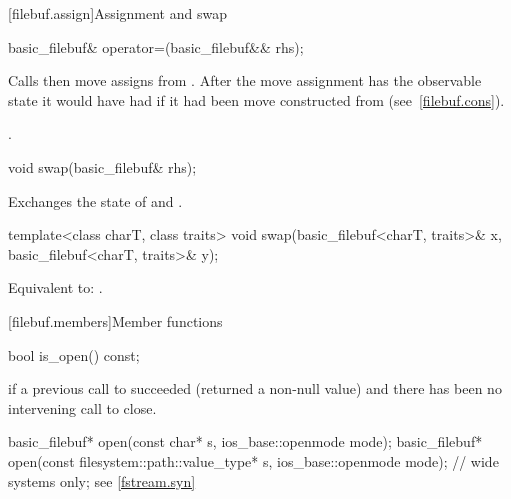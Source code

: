[filebuf.assign]{Assignment and swap}

%
\begin{itemdecl}
basic_filebuf& operator=(basic_filebuf&& rhs);
\end{itemdecl}

\begin{itemdescr}
\pnum
\effects
Calls  then move assigns from . After the
move assignment  has the observable state it would have had if it
had been move constructed from  (see~\ref{filebuf.cons}).

\pnum
\returns
{}.
\end{itemdescr}

%
\begin{itemdecl}
void swap(basic_filebuf& rhs);
\end{itemdecl}

\begin{itemdescr}
\pnum
\effects
Exchanges the state of 
and .
\end{itemdescr}

%
\begin{itemdecl}
template<class charT, class traits>
  void swap(basic_filebuf<charT, traits>& x, basic_filebuf<charT, traits>& y);
\end{itemdecl}

\begin{itemdescr}
\pnum
\effects
Equivalent to: .
\end{itemdescr}

[filebuf.members]{Member functions}

%
\begin{itemdecl}
bool is_open() const;
\end{itemdecl}

\begin{itemdescr}
\pnum
\returns
{}
if a previous call to
succeeded (returned a non-null value) and there has been no intervening
call to close.
\end{itemdescr}

%
\begin{itemdecl}
basic_filebuf* open(const char* s, ios_base::openmode mode);
basic_filebuf* open(const filesystem::path::value_type* s,
                    ios_base::openmode mode);  // wide systems only; see \ref{fstream.syn}
\end{itemdecl}

